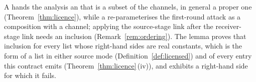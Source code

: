 
A  hands the analysis an
 that is a subset of the channels, in general a proper one
(Theorem~\ref{thm:licence}), while a 
re-parameterises the first-round attack as a composition
with a channel; applying the source-stage link after the receiver-stage link
needs an inclusion (Remark~\ref{rem:ordering}). The lemma proves that inclusion for every list
whose right-hand sides are real constants, which is the form of a
 list in either source mode (Definition~\ref{def:licensed}) and of every entry
this contract emits (Theorem~\ref{thm:licence}\,(iv)), and exhibits a
right-hand side for which it fails.

